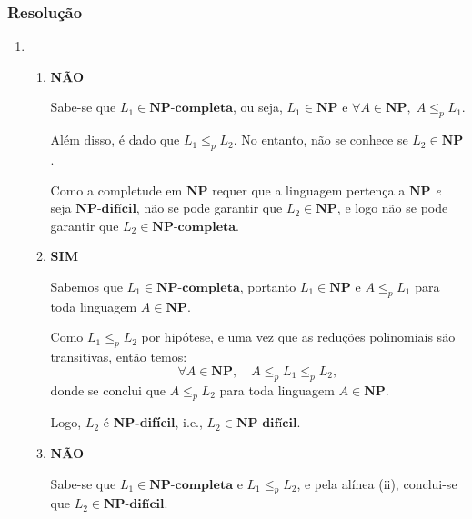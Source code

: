 \documentclass[a4paper,12pt]{article}
\begin{document}
\subsubsection*{Resolução}
\begin{enumerate}[label=\alph*)]
  \item
  \begin{enumerate}[label=\roman*)]
    \item
    \textbf{NÃO}

    \vspace{0.3cm}
    Sabe-se que $L_1 \in \textbf{NP-completa}$, ou seja, $L_1 \in \textbf{NP}$ e $\forall A \in \textbf{NP}, \; A \leq_p L_1$.

    \vspace{0.3cm}
    Além disso, é dado que $L_1 \leq_p L_2$. No entanto, não se conhece se $L_2 \in \textbf{NP}$.

    \vspace{0.3cm}
    Como a completude em $\textbf{NP}$ requer que a linguagem pertença a $\textbf{NP}$ \textit{e} seja $\textbf{NP-difícil}$, não se pode garantir que $L_2 \in \textbf{NP}$, e logo não se pode garantir que $L_2 \in \textbf{NP-completa}$.

    \vspace{0.5cm}
    
    \item
    \textbf{SIM}

    \vspace{0.3cm}
    Sabemos que $L_1 \in \textbf{NP-completa}$, portanto $L_1 \in \textbf{NP}$ e $A \leq_p L_1$ para toda linguagem $A \in \textbf{NP}$.

    \vspace{0.3cm}
    Como $L_1 \leq_p L_2$ por hipótese, e uma vez que as reduções polinomiais são transitivas, então temos:
    \[
    \forall A \in \textbf{NP}, \quad A \leq_p L_1 \leq_p L_2,
    \]
    donde se conclui que $A \leq_p L_2$ para toda linguagem $A \in \textbf{NP}$.

    \vspace{0.3cm}
    Logo, $L_2$ é \textbf{NP-difícil}, i.e., $L_2 \in \textbf{NP-difícil}$.

    \vspace{0.5cm}
    
    \item
    \textbf{NÃO}

    \vspace{0.3cm}
    Sabe-se que $L_1 \in \textbf{NP-completa}$ e $L_1 \leq_p L_2$, e pela alínea (ii), conclui-se que $L_2 \in \textbf{NP-difícil}$.


\end{enumerate}
\end{enumerate}
\end{document}
